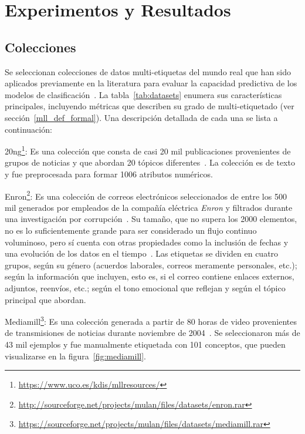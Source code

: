 \chapter{Experimentos y Resultados}

\section{Colecciones}

Se seleccionan colecciones de datos multi-etiquetas del mundo real que han sido
aplicados previamente en la literatura para evaluar la capacidad predictiva de
los modelos de
clasificación~\cite{osojnik_multi-label_2017,read_scalable_2012,buyukcakir_novel_2018}.
La tabla~\ref{tab:datasets} enumera sus características principales, incluyendo
métricas que describen su grado de multi-etiquetado (ver
sección~\ref{mll_def_formal}). Una descripción detallada de cada una se lista a
continuación:

\begin{description}

	\item{20ng}\footnote{\url{https://www.uco.es/kdis/mllresources/}}: Es una
	      colección que consta de casi 20 mil publicaciones provenientes de grupos de
	      noticias y que abordan 20 tópicos diferentes~\cite{lang_newsweeder_1995}.
	      La colección es de texto y fue preprocesada para formar 1006 atributos
	      numéricos.

	\item{Enron}\footnote{\url{http://sourceforge.net/projects/mulan/files/datasets/enron.rar}}:
	      Es una colección de correos electrónicos seleccionados de entre los 500
	      mil generados por empleados de la compañía eléctrica \textit{Enron} y
	      filtrados durante una investigación por
	      corrupción~\cite{hutchison_enron_2004}. Su tamaño, que no supera los
	      2000 elementos, no es lo suficientemente grande para ser considerado un
	      flujo continuo voluminoso, pero sí cuenta con otras propiedades como la
	      inclusión de fechas y una evolución de los datos en el
	      tiempo~\cite{read_scalable_2012}. Las etiquetas se dividen en cuatro
	      grupos, según su género (acuerdos laborales, correos meramente
	      personales, etc.); según la información que incluyen, esto es, si el
	      correo contiene enlaces externos, adjuntos, reenvíos, etc.; según el
	      tono emocional que reflejan y según el tópico principal que abordan.

	\item{Mediamill}\footnote{\url{https://sourceforge.net/projects/mulan/files/datasets/mediamill.rar}}:
	      Es una colección generada a partir de 80 horas de video provenientes de
	      transmisiones de noticias durante noviembre de
	      2004~\cite{snoek_challenge_2006}. Se seleccionaron más de 43 mil
	      ejemplos y fue manualmente etiquetada con 101 conceptos, que pueden
	      visualizarse en la figura~\ref{fig:mediamill}.

\end{description}

